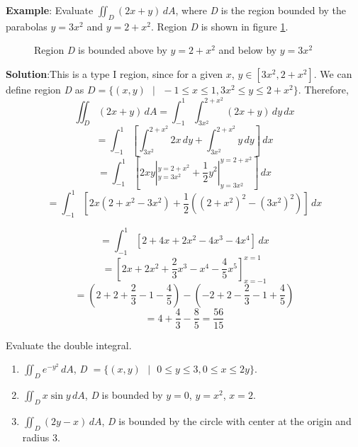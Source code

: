 \textbf{Example}: Evaluate $\iint_{\textit{D}} (2x + y)\,dA$, where \textit{D} 
is the region bounded by the parabolas $y = 3x^2$ and $y = 2 + x^2$. Region 
\textit{D} is shown in figure \ref{fig:parabola}. 

\begin{figure}[htbp]
\centering
    \caption{Region \textit{D} is bounded above by $y = 2 + x^2$ and below by 
    $y = 3x^2$}
    \label{fig:parabola}
\end{figure}

\textbf{Solution}:This is a type I region, since for a given $x$, $y \in \left[
3x^2, 2 + x^2 \right]$. We can define region \textit{D} as $\textit{D} = \{(x, 
y) \text{ }|\text{ } -1 \leq x \leq 1, 3x^2 \leq y \leq 2 + x^2 \}$. Therefore, 
$$\iint_{\textit{D}} (2x + y)\,dA = \int_{-1}^1 \int_{3x^2}^{2 + x^2} \left(2x 
+ y \right)\,dy\,dx$$
$$= \int_{-1}^1 \left[ \int_{3x^2}^{2 + x^2} 2x\,dy + \int_{3x^2}^{2 + x^2} y
\,dy \right]\,dx$$
$$= \int_{-1}^{1} \left[ 2xy|_{y = 3x^2}^{y = 2 + x^2} + \frac{1}{2}y^2|_{y = 
3x^2}^{y = 2+x^2} \right]\,dx$$
$$= \int_{-1}^1 \left[ 2x \left( 2 + x^2 - 3x^2 \right) + \frac{1}{2} \left( 
(2 + x^2)^2 - (3x^2)^2 \right) \right]\,dx$$

$$= \int_{-1}^1 \left[ 2 + 4x + 2x^2 - 4x^3 - 4x^4 \right]\,dx$$
$$= \left[ 2x + 2x^2 + \frac{2}{3}x^3 - x^4 - \frac{4}{5}x^5 \right]_{x = -1}^{
x = 1}$$
$$= \left( 2 + 2 + \frac{2}{3} - 1 - \frac{4}{5} \right) - \left( -2 + 2 - 
\frac{2}{3} - 1 + \frac{4}{5} \right)$$
$$= 4 + \frac{4}{3} - \frac{8}{5} = \frac{56}{15}$$

\begin{Exercise}[title = {Double Integrals over Non-Rectangular Regions}, 
label = non-rect]
Evaluate the double integral.
\begin{enumerate}
\item $\iint_{\textit{D}} e^{-y^2} \,dA$, \textit{D} $= \{(x, y) \text{ } | 
\text{ } 0 \leq y \leq 3, 0 \leq x \leq 2y \}$.
\item $\iint_{\textit{D}} x \sin{y}\,dA$, \textit{D} is bounded by $y = 0$, 
$y = x^2$, $x = 2$. 
\item $\iint_{\textit{D}} \left(2y - x \right)\,dA$, \textit{D} is bounded by 
the circle with center at the origin and radius 3. 
\vspace{75mm}
\end{enumerate}
\end{Exercise}

